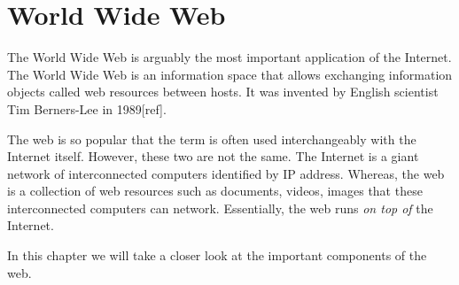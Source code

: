 \chapter{World Wide Web}
\label{chap:www}
The World Wide Web is arguably the most important application of the
Internet. The World Wide Web is an information space that allows
exchanging information objects called web resources between hosts. It
was invented by English scientist Tim Berners-Lee in 1989[ref].

The web is so popular that the term is often used interchangeably with
the Internet itself. However, these two are not the same. The Internet
is a giant network of interconnected computers identified by IP
address. Whereas, the web is a collection of web resources such as
documents, videos, images that these interconnected computers can
network. Essentially, the web runs \emph{on top of} the Internet.

In this chapter we will take a closer look at the important components
of the web.

